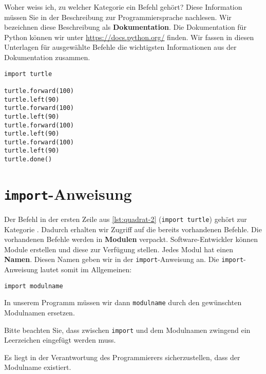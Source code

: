 Woher weiss ich, zu welcher Kategorie ein Befehl gehört? Diese Information müssen Sie in der Beschreibung zur Programmiersprache nachlesen. Wir bezeichnen diese Beschreibung als \textbf{Dokumentation}. Die Dokumentation für Python können wir unter \url{https://docs.python.org/} finden. Wir fassen in diesen Unterlagen für ausgewählte Befehle die wichtigsten Informationen aus der Dokumentation zusammen.

\begin{lstlisting}[language={python3}, caption={Python-Programm für ein Quadrat.}, label={lst:quadrat-2}]
import turtle

turtle.forward(100)
turtle.left(90)
turtle.forward(100)
turtle.left(90)
turtle.forward(100)
turtle.left(90)
turtle.forward(100)
turtle.left(90)
turtle.done()

\end{lstlisting}


\section{\lstinline[language={python3}]{import}-Anweisung}
\label{sec:import-anweisung}

Der Befehl in der ersten Zeile aus \autoref{lst:quadrat-2} (\lstinline[language={python3}]{import turtle}) gehört zur Kategorie . Dadurch erhalten wir Zugriff auf die bereits vorhandenen Befehle. Die vorhandenen Befehle werden in \textbf{Modulen} verpackt. Software-Entwickler können Module erstellen und diese zur Verfügung stellen. Jedes Modul hat einen \textbf{Namen}. Diesen Namen geben wir in der \lstinline[language={python3}]{import}-Anweisung an. Die \lstinline[language={python3}]{import}-Anweisung lautet somit im Allgemeinen:

\begin{center}
    \lstinline[language={python3}]{import modulname}
\end{center}

In unserem Programm müssen wir dann \lstinline[language={python3}]{modulname} durch den gewünschten Modulnamen ersetzen.

\begin{important}
    Bitte beachten Sie, dass zwischen \lstinline[language={python3}]{import} und dem Modulnamen zwingend ein Leerzeichen eingefügt werden muss.
\end{important}

Es liegt in der Verantwortung des Programmierers sicherzustellen, dass der Modulname existiert.

